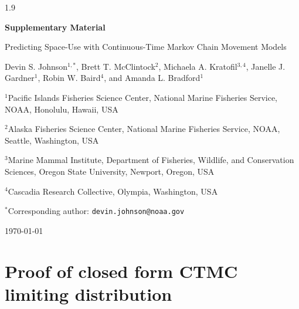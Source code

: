 \documentclass[12pt]{article}
\begin{document}
\begin{spacing}{1.9}


\setlength{\parindent}{0pt}

\begin{center}

{\Large \bf Supplementary Material} \bigskip

{\large Predicting Space-Use with Continuous-Time Markov Chain Movement Models}

\bigskip\bigskip

\begin{minipage}{0.75\textwidth}
\begin{center}
{Devin S. Johnson}$^{1,*}$, Brett T. McClintock$^2$, Michaela A. Kratofil$^{3,4}$, Janelle J. Gardner$^1$, Robin W. Baird$^4$, and Amanda L. Bradford$^1$ \bigskip

$^1$Pacific Islands Fisheries Science Center, National Marine Fisheries Service, NOAA, Honolulu, Hawaii, USA 

$^2$Alaska Fisheries Science Center, National Marine Fisheries Service, NOAA, Seattle, Washington, USA 

$^3$Marine Mammal Institute, Department of Fisheries, Wildlife, and Conservation Sciences, Oregon State University, Newport, Oregon, USA

$^4$Cascadia Research Collective, Olympia, Washington, USA


$^*$Corresponding author: {\tt devin.johnson@noaa.gov}
\end{center}
\end{minipage}


\bigskip

\today


\vspace*{\fill}

\end{center}

\clearpage


\raggedright
\setlength{\parindent}{2em}
\raggedbottom
\linenumbers

\section{Proof of closed form CTMC limiting distribution}


\end{spacing}
\end{document}
